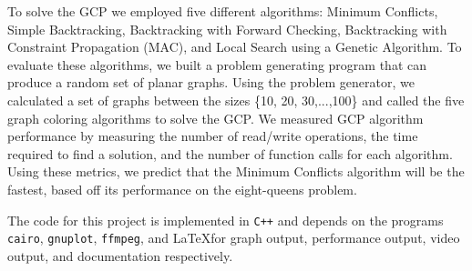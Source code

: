 \documentclass{article}
\begin{document}
	To solve the GCP we employed five different algorithms: Minimum Conflicts, Simple Backtracking, Backtracking with Forward Checking, Backtracking with Constraint Propagation (MAC), and Local Search using a Genetic Algorithm. To evaluate these algorithms, we built a problem generating program that can produce a random set of planar graphs. Using the problem generator, we calculated a set of graphs between the sizes \{10, 20, 30,...,100\} and called the five graph coloring algorithms to solve the GCP. We measured GCP algorithm performance by measuring the number of read/write operations, the time required to find a solution, and the number of function calls for each algorithm. Using these metrics, we predict that the Minimum Conflicts algorithm will be the fastest, based off its performance on the eight-queens problem\cite{ai}.


\par The code for this project is implemented in \texttt{C++} and depends on the programs \texttt{cairo}, \texttt{gnuplot}, \texttt{ffmpeg}, and \LaTeX \space for graph output, performance output, video output, and documentation respectively.
\end{document}
